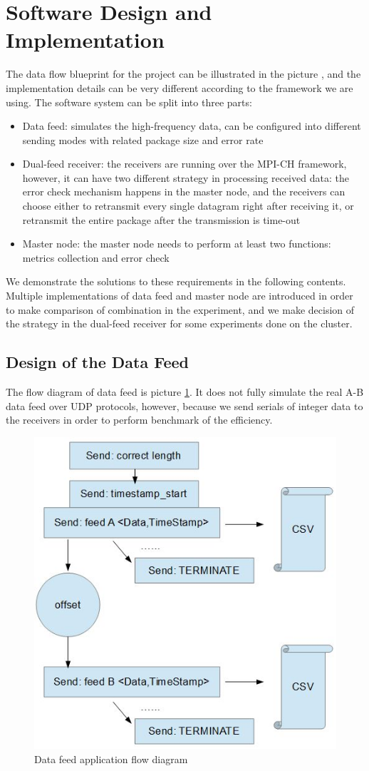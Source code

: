 \documentclass[11pt,openright,a4paper]{report}
\begin{document}
\section{Software Design and Implementation}
The data flow blueprint for the project can be illustrated in the picture \cite{fig:LogicDesign}, and the implementation details can be very different according to the framework we are using. The software system can be split into three parts:
\begin{itemize}
	\item Data feed: simulates the high-frequency data, can be configured into different sending modes with related package size and error rate
	\item Dual-feed receiver: the receivers are running over the MPI-CH framework, however, it can have two different strategy in processing received data: the error check mechanism happens in the master node, and the receivers can choose either to retransmit every single datagram right after receiving it, or retransmit the entire package after the transmission is time-out
	\item Master node: the master node needs to perform at least two functions: metrics collection and error check
\end{itemize}
We demonstrate the solutions to these requirements in the following contents. Multiple implementations of data feed and master node are introduced in order to make comparison of combination in the experiment, and we make decision of the strategy in the dual-feed receiver for some experiments done on the cluster. 

\subsection{Design of the Data Feed}
The flow diagram of data feed is picture \ref{fig:sender-diagram}. It does not fully simulate the real A-B data feed over UDP protocols, however, because we send serials of integer data to the receivers in order to perform benchmark of the efficiency. 
\begin{figure}[H]
\centering
\includegraphics[width=0.5\linewidth]{picture/sender-diagram}
\caption{Data feed application flow diagram}
\label{fig:sender-diagram}
\end{figure}
\end{document}
